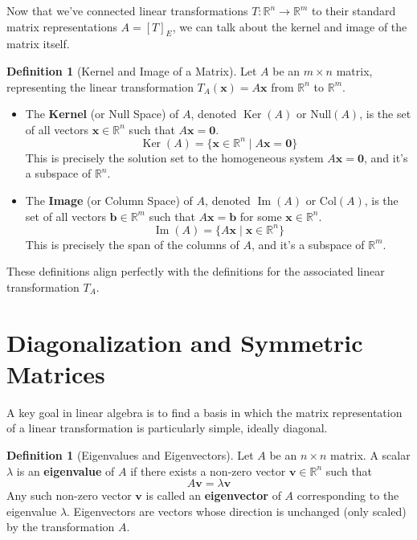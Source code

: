 \documentclass[11pt]{article}
\theoremstyle{definition}
\newtheorem{definition}[theorem]{Definition}
\theoremstyle{remark}
\DeclareMathOperator{\Ker}{Ker}
\DeclareMathOperator{\Image}{Im}
\begin{document}
Now that we've connected linear transformations $T:\mathbb{R}^n \to \mathbb{R}^m$ to their standard matrix representations $A = [T]_E$, we can talk about the kernel and image of the matrix itself.

\begin{definition}[Kernel and Image of a Matrix]
Let $A$ be an $m \times n$ matrix, representing the linear transformation $T_A(\mathbf{x}) = A\mathbf{x}$ from $\mathbb{R}^n$ to $\mathbb{R}^m$.
\begin{itemize}
    \item The \textbf{Kernel} (or Null Space) of $A$, denoted $\Ker(A)$ or $\text{Null}(A)$, is the set of all vectors $\mathbf{x} \in \mathbb{R}^n$ such that $A\mathbf{x} = \mathbf{0}$.
    \[ \Ker(A) = \{ \mathbf{x} \in \mathbb{R}^n \mid A\mathbf{x} = \mathbf{0} \} \]
    This is precisely the solution set to the homogeneous system $A\mathbf{x} = \mathbf{0}$, and it's a subspace of $\mathbb{R}^n$.
    \item The \textbf{Image} (or Column Space) of $A$, denoted $\Image(A)$ or $\text{Col}(A)$, is the set of all vectors $\mathbf{b} \in \mathbb{R}^m$ such that $A\mathbf{x} = \mathbf{b}$ for some $\mathbf{x} \in \mathbb{R}^n$.
    \[ \Image(A) = \{ A\mathbf{x} \mid \mathbf{x} \in \mathbb{R}^n \} \]
    This is precisely the span of the columns of $A$, and it's a subspace of $\mathbb{R}^m$.
\end{itemize}
These definitions align perfectly with the definitions for the associated linear transformation $T_A$.
\end{definition}

\section{Diagonalization and Symmetric Matrices}

A key goal in linear algebra is to find a basis in which the matrix representation of a linear transformation is particularly simple, ideally diagonal.

\begin{definition}[Eigenvalues and Eigenvectors]
Let $A$ be an $n \times n$ matrix. A scalar $\lambda$ is an \textbf{eigenvalue} of $A$ if there exists a non-zero vector $\mathbf{v} \in \mathbb{R}^n$ such that
\[ A\mathbf{v} = \lambda \mathbf{v} \]
Any such non-zero vector $\mathbf{v}$ is called an \textbf{eigenvector} of $A$ corresponding to the eigenvalue $\lambda$.
Eigenvectors are vectors whose direction is unchanged (only scaled) by the transformation $A$.
\end{definition}
\end{document}
